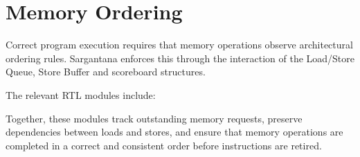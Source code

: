\section{Memory Ordering}

Correct program execution requires that memory operations observe architectural ordering
rules. Sargantana enforces this through the interaction of the Load/Store Queue, Store Buffer
and scoreboard structures.

The relevant RTL modules include:

\begin{rtlrefs}
\end{rtlrefs}

Together, these modules track outstanding memory requests, preserve dependencies between
loads and stores, and ensure that memory operations are completed in a correct and consistent
order before instructions are retired.
